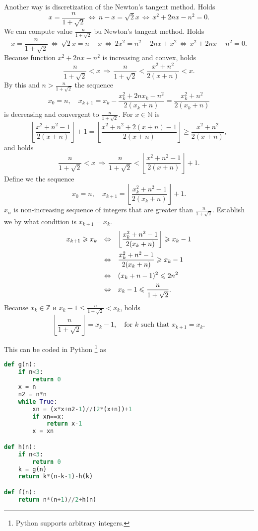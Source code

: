 \documentclass[a4paper]{article}
\begin{document}
{	Another way is discretization of the Newton's tangent method. Holds
	$$
	x=\frac{n}{1+\sqrt 2}\,\Leftrightarrow\,n-x=\sqrt 2x\,\Leftrightarrow\,x^2+2nx-n^2=0.
	$$
	We can compute value $\frac n{1+\sqrt 2}$ bu Newton's tangent method. Holds
	$$
	x=\frac{n}{1+\sqrt 2}\,\Leftrightarrow\,\sqrt 2x=n-x\,\Leftrightarrow\,2x^2=n^2-2nx+x^2
	\,\Leftrightarrow\,x^2+2nx-n^2=0.
	$$
	Because function $x^2+2nx-n^2$ is increasing and convex, holds
	$$
	\frac{n}{1+\sqrt 2}<x\,\Rightarrow\,\frac{n}{1+\sqrt 2}<\frac{x^2+n^2}{2(x+n)}<x.
	$$
	By this and $n>\frac n{1+\sqrt 2}$ the sequence
	$$
	x_0=n,\quad x_{k+1}=x_k-\frac{x_k^2+2nx_k-n^2}{2(x_k+n)}=\frac{x_k^2+n^2}{2(x_k+n)}
	$$
	is decreasing and convergent to $\frac n{1+\sqrt 2}$.
	For $x\in\mathbb N$ is
	$$
	\left\lfloor\frac{x^2+n^2-1}{2(x+n)}\right\rfloor+1=
	\left\lfloor\frac{x^2+n^2+2(x+n)-1}{2(x+n)}\right\rfloor
	\geqslant\frac{x^2+n^2}{2(x+n)},
	$$
	and holds
	$$
	\frac{n}{1+\sqrt 2}<x\,\Rightarrow\,\frac{n}{1+\sqrt 2}<\left\lfloor\frac{x^2+n^2-1}{2(x+n)}\right\rfloor+1.
	$$
	Define we the sequence
	$$
	x_0=n,\quad x_{k+1}=\left\lfloor\frac{x_k^2+n^2-1}{2(x_k+n)}\right\rfloor+1.
	$$
	$x_n$ is non-increasing sequence of integers that are greater than $\frac n{1+\sqrt 2}$.
	Establish we by what condition is
	$x_{k+1}=x_k$.
	$$
	\begin{array}{rcl}
	x_{k+1}\geqslant x_k
	& \Leftrightarrow & \displaystyle
	\left\lfloor\frac{x_k^2+n^2-1}{2(x_k+n)}\right\rfloor\geqslant x_k-1
	\vspace{0.5em}\\
	& \Leftrightarrow & \displaystyle
	\frac{x_k^2+n^2-1}{2(x_k+n)}\geqslant x_k-1
	\vspace{0.5em}\\
	& \Leftrightarrow & \displaystyle
	(x_k+n-1)^2\leqslant 2n^2
	\vspace{0.5em}\\
	& \Leftrightarrow & \displaystyle
	x_k-1\leqslant\frac n{1+\sqrt 2}.
	\end{array}
	$$
	Because $x_k\in\mathbb Z$ и $x_k-1\leqslant\frac n{1+\sqrt 2}<x_k$, holds
	$$
	\left\lfloor\frac n{1+\sqrt 2}\right\rfloor=x_k-1,\quad\mbox{for }k\mbox{ such that }x_{k+1}=x_k.
	$$
}

This can be coded in Python \footnote{Python supports arbitrary integers.} as

\begin{lstlisting}[language=Python]
def g(n):
	if n<3:
		return 0
	x = n
	n2 = n*n
	while True:
		xn = (x*x+n2-1)//(2*(x+n))+1
		if xn==x:
			return x-1
		x = xn

def h(n):
	if n<3:
		return 0
	k = g(n)
	return k*(n-k-1)-h(k)

def f(n):
	return n*(n+1)//2+h(n)
\end{lstlisting}
\end{document}
